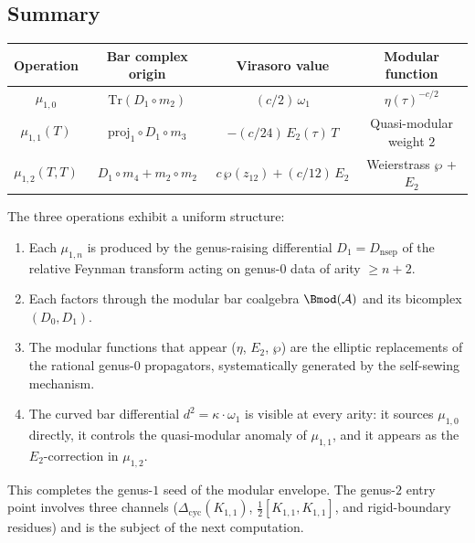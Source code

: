 \documentclass[11pt]{article}
\newcommand{\cA}{\mathcal{A}}
\begin{document}
\subsection{Summary}

\begin{center}
\renewcommand{\arraystretch}{1.5}
\begin{tabular}{@{}cccc@{}}
\toprule
Operation & Bar complex origin & Virasoro value & Modular function \\
\midrule
$\mu_{1,0}$ & $\mathrm{Tr}(D_1 \circ m_2)$
  & $(c/2)\,\omega_1$
  & $\eta(\tau)^{-c/2}$ \\
$\mu_{1,1}(T)$ & $\mathrm{proj}_1 \circ D_1 \circ m_3$
  & $-(c/24)\,E_2(\tau)\,T$
  & Quasi-modular weight $2$ \\
$\mu_{1,2}(T,T)$ & $D_1 \circ m_4 + m_2 \circ m_2$
  & $c\,\wp(z_{12}) + (c/12)\,E_2$
  & Weierstrass $\wp$ + $E_2$ \\
\bottomrule
\end{tabular}
\end{center}

The three operations exhibit a uniform structure:
\begin{enumerate}[label=\textup{(\roman*)}]
\item Each $\mu_{1,n}$ is produced by the genus-raising differential
  $D_1 = D_{\mathrm{nsep}}$ of the relative Feynman transform
  acting on genus-$0$ data of arity $\geq n+2$.
\item Each factors through the modular bar coalgebra $\Bmod(\cA)$
  and its bicomplex $(D_0, D_1)$.
\item The modular functions that appear ($\eta$, $E_2$, $\wp$) are
  the elliptic replacements of the rational genus-$0$ propagators,
  systematically generated by the self-sewing mechanism.
\item The curved bar differential $d^2 = \kappa \cdot \omega_1$ is
  visible at every arity: it sources $\mu_{1,0}$ directly, it
  controls the quasi-modular anomaly of $\mu_{1,1}$, and it appears
  as the $E_2$-correction in $\mu_{1,2}$.
\end{enumerate}

This completes the genus-$1$ seed of the modular envelope.  The
genus-$2$ entry point involves three channels
($\Delta_{\mathrm{cyc}}(K_{1,1})$, $\frac{1}{2}[K_{1,1},K_{1,1}]$,
and rigid-boundary residues) and is the subject of the next computation.



\end{document}
